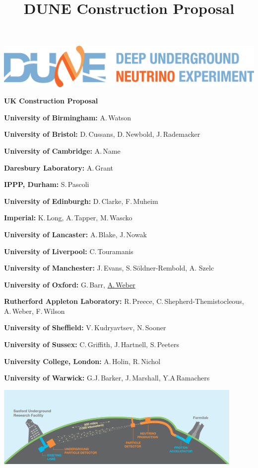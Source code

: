 \documentclass[a4paper,11pt]{article}
\begin{document}
\setcounter{page}{0}

\title{DUNE Construction Proposal}

\begin{center}

\includegraphics[width=\textwidth]{figs/dune-horiz-logo-lg.png}
\vspace{1ex}

{\LARGE\bf 
UK Construction Proposal
}
\vfill

{\bf University of Birmingham:} A.\,Watson

{\bf University of Bristol:} D.\,Cussans, D.\,Newbold, J.\,Rademacker

{\bf University of Cambridge:} A.\,Name

{\bf Daresbury Laboratory:} A.\,Grant

{\bf IPPP, Durham:} S.\,Pascoli

{\bf University of Edinburgh:} D.\,Clarke, F.\,Muheim

{\bf Imperial:} K.\,Long, A.\,Tapper, M.\,Wascko

{\bf University of Lancaster:} A.\,Blake, J.\,Nowak

{\bf University of Liverpool:} C.\,Touramanis

{\bf University of Manchester:} J.\,Evans, S.\,S\"oldner-Rembold, A. Szelc

{\bf University of Oxford:} G.\,Barr, \underline{A.\,Weber}

{\bf Rutherford Appleton Laboratory:} R.\,Preece, C.\,Shepherd-Themistocleous, A.\,Weber, F.\,Wilson

{\bf University of Sheffield:} V.\,Kudryavtsev, N.\,Sooner

{\bf University of Sussex:} C.\,Griffith, J.\,Hartnell, S.\,Peeters

{\bf University College, London:} A.\,Holin, R.\,Nichol

{\bf University of Warwick:} G.J.\,Barker, J.\,Marshall, Y.A\,Ramachers

\vfill

\includegraphics[width=0.9\textwidth]{figs/LBNE_Graphic_061615_2016.jpg}
\end{center}
\vfill
\end{document}
